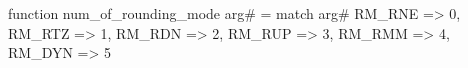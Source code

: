 function num_of_rounding_mode arg# = match arg# {
  RM_RNE => 0,
  RM_RTZ => 1,
  RM_RDN => 2,
  RM_RUP => 3,
  RM_RMM => 4,
  RM_DYN => 5
}
